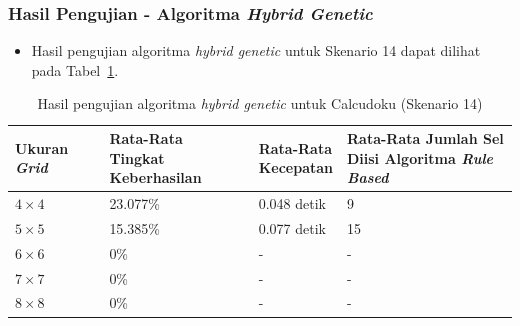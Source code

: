 \documentclass{beamer}
\begin{document}
\begin{frame}
\frametitle{Hasil Pengujian - Algoritma \textit{Hybrid Genetic}}
\begin{itemize}
\item Hasil pengujian algoritma \textit{hybrid genetic} untuk Skenario 14 dapat dilihat pada Tabel~\ref{tab:pengujianhg14}.
\end{itemize}
\begin{table}
\tiny
\centering
\captionsetup{justification=centering}
\caption[Hasil pengujian algoritma \textit{hybrid genetic} untuk Calcudoku (Skenario 14)]{Hasil pengujian algoritma \textit{hybrid genetic} untuk Calcudoku (Skenario 14)}
\begin{tabular}{| l | l | l | l |}
\hline
Ukuran \textit{Grid} & \makecell[c]{Rata-Rata \\ Tingkat Keberhasilan} & \makecell[c]{Rata-Rata \\ Kecepatan} & \makecell[c]{Rata-Rata Jumlah Sel \\ Diisi Algoritma \textit{Rule Based}} \\
\hline \hline
\begin{math}4 \times 4\end{math} & 23.077\% & 0.048 detik & 9 \\
\hline
\begin{math}5 \times 5\end{math} & 15.385\% & 0.077 detik & 15 \\
\hline
\begin{math}6 \times 6\end{math} & 0\% & - & - \\
\hline
\begin{math}7 \times 7\end{math} & 0\% & - & - \\
\hline
\begin{math}8 \times 8\end{math} & 0\% & - & - \\
\hline
\end{tabular}
\label{tab:pengujianhg14}
\end{table}
\end{frame}

\end{document}
